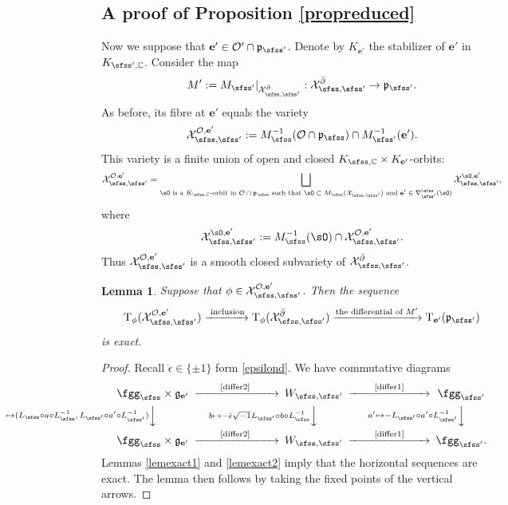 \documentclass[12pt,a4paper]{amsart}
\newcommand{\CO}{{\mathcal {O}}}
\newcommand{\CX}{{\mathcal {X}}}
\newcommand{\g}{\mathfrak g}
\newcommand{\p}{\mathfrak p}
\newcommand{\be}{\begin {equation}}
\newcommand{\ee}{\end {equation}}
\numberwithin{equation}{section}
\newtheorem{lem}[thm]{Lemma}
\theoremstyle{remark}
\begin{document}
\subsection{A proof of Proposition \ref{propreduced}} \label{secpp}
Now we suppose that $\mathbf e'\in \CO'\cap \p_{\sfss'}$. Denote by $K_{\mathbf e'}$ the stabilizer of $\mathbf e'$ in $K_{\sfss',\C}$. Consider the map
\[
 M':=  M_{\sfss'}|_{\CX_{\sfss, \sfss'}^{\bar \partial}} : \CX_{\sfss, \sfss'}^{\bar \partial}\rightarrow \p_{\sfss'}. 
\]
As before, its fibre at $\mathbf e'$ equals the variety
\[
\CX_{\sfss, \sfss'}^{\CO, \mathbf e'}:=M_{\sfss}^{-1}(\CO\cap \p_\sfss)\cap  M_{\sfss'}^{-1}(\mathbf e').
\]
This variety is a finite union of open and closed 
$K_{\sfss,\C}\times K_{\mathbf e'}$-orbits: 
\[
   \CX_{\sfss, \sfss'}^{\CO, \mathbf e'}=\bigsqcup_{\sO\textrm{ is a   $K_{\sfss, \C}$-orbit in $ \CO\cap \p_\sfss$ such that $\sO\subset M_\sfss(\CX_{\sfss, \sfss'})$ and $\mathbf e'\in \nabla^\sfss_{\sfss'}(\sO)$}}  \CX_{\sfss, \sfss'}^{\sO, \mathbf e'},
 \]
 where
 \[
   \CX_{\sfss, \sfss'}^{\sO, \mathbf e'}:=M_\sfss^{-1}(\sO)\cap \CX_{\sfss, \sfss'}^{\CO, \mathbf e'}. 
 \]
Thus  $\CX_{\sfss, \sfss'}^{\CO, \mathbf e'}$ is a smooth closed subvariety of $\CX_{\sfss, \sfss'}^{\bar \partial}$. 

\begin{lem}\label{jacobic22}
Suppose that  $\phi\in \CX_{\sfss, \sfss'}^{\CO, \mathbf e'}$. Then the sequence 
\be\label{jc111}
    \mathrm T_\phi (\CX_{\sfss, \sfss'}^{\CO, \mathbf e'})\xrightarrow{\textrm{ inclusion}} \mathrm T_\phi(\CX_{\sfss, \sfss'}^{\bar \partial})\xrightarrow{\textrm{the differential of $M'$}} \mathrm T_{\mathbf e'}(\p_{\sfss'})
\ee
is exact. 
\end{lem}
\begin{proof}
Recall $\dot \epsilon\in \{\pm 1\}$ form \eqref{epsilond}. We have commutative diagrams
\[
 \begin{CD} 
 \fggs \times  \g_{\mathbf e'} @>  \qquad  \textrm{\eqref{differ2} }\qquad  >>  W_{\sfss, \sfss'}
  @> \qquad  \textrm{\eqref{differ1}} \qquad  >>\fggsp\\
  @V(a,\,a') \mapsto  (L_\sfss\circ a \circ L_{\sfss}^{-1},\,  L_{\sfss'} \circ a' \circ L_{\sfss'}^{-1}) VV  @V b\mapsto - \dot \epsilon \sqrt{-1} L_{\sfss'}\circ b \circ L_\sfss^{-1} VV 
  @V a' \mapsto - L_{\sfss'} \circ a' \circ L_{\sfss'}^{-1} VV \\
\fggs \times  \g_{\mathbf e'} @> \qquad   \textrm{\eqref{differ2} }\qquad  >>  W_{\sfss, \sfss'}
  @>\qquad  \textrm{\eqref{differ1}} \qquad  >> \fggsp.
\end{CD}
\]
Lemmas \ref{lemexact1} and \ref{lemexact2} imply that the horizontal sequences are exact. The lemma then follows by taking the fixed points of the vertical arrows. 

\end{proof}
\end{document}
